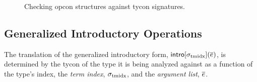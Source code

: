 \documentclass[10pt,preprint]{sigplanconf}
\begin{document}
\begin{figure*}[t]
\small\fbox{$\vdash_\Phi \omega \sim \psi$}
\vspace{-25px}
\begin{mathpar}\small
\hspace{50px}

\end{mathpar}\vspace{-5px}
\caption{Checking opcon structures against tycon signatures.}
\label{ocstruct}
\end{figure*}




\subsection{Generalized Introductory Operations}\label{sec:introop}
The translation of the generalized introductory form, $\eintro{\sttmidx}{\es}$, is determined by the tycon of the type it is being analyzed against as a function of the type's index, the \emph{term index}, $\sttmidx$, and the \emph{argument list}, $\es$.
\end{document}
